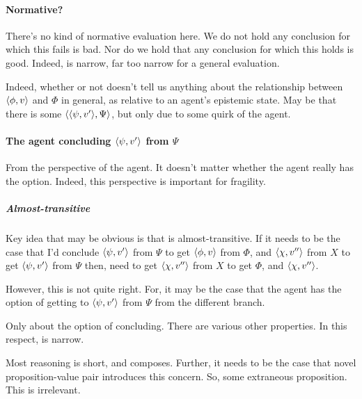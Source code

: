 \paragraph*{Normative?}

\begin{note}
  There's no kind of normative evaluation here.
  We do not hold any conclusion for which this fails is bad.
  Nor do we hold that any conclusion for which this holds is good.
  Indeed, \zS{} is narrow, far too narrow for a general evaluation.

  Indeed, whether or not \zS{} doesn't tell us anything about the relationship between \(\langle \phi, v \rangle\) and \(\Phi\) in general, as relative to an agent's epistemic state.
  May be that there is some \(\langle \langle \psi, v' \rangle, \Psi \rangle\), but only due to some quirk of the agent.
\end{note}

\paragraph*{The agent concluding \(\langle \psi, v' \rangle\) from \(\Psi\)}

\begin{note}
  From the perspective of the agent.
  It doesn't matter whether the agent really has the option.
  Indeed, this perspective is important for fragility.
\end{note}

\subparagraph*{Almost-transitive}

\begin{note}
  Key idea that may be obvious is that \csN{} is almost-transitive.
  If it needs to be the case that I'd conclude \(\langle \psi, v' \rangle\) from \(\Psi\) to get \(\langle \phi, v \rangle\) from \(\Phi\), and \(\langle \chi, v'' \rangle\) from \(X\) to get \(\langle \psi, v' \rangle\) from \(\Psi\) then, need to get \(\langle \chi, v'' \rangle\) from \(X\) to get \(\Phi\), and \(\langle \chi, v'' \rangle\).

  However, this is not quite right.
  For, it may be the case that the agent has the option of getting to \(\langle \psi, v' \rangle\) from \(\Psi\) from the different branch.
\end{note}

\begin{note}
  Only about the option of concluding.
  There are various other properties.
  In this respect, \qzS{} is narrow.
\end{note}

\begin{note}
  Most reasoning is short, and composes.
  Further, it needs to be the case that novel proposition-value pair introduces this concern.
  So, some extraneous proposition.
  This is irrelevant.
\end{note}

